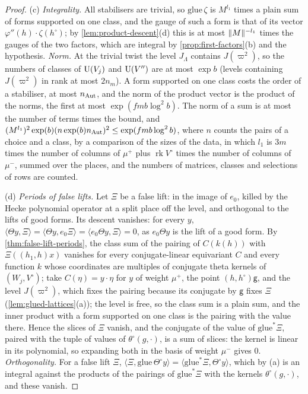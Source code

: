\begin{proof}
(c) \emph{Integrality.} All stabilisers are trivial, so $\mathrm{glue}\,\zeta$ is $M^{l_1}$ times a plain sum of forms supported on one class, and the gauge of such a form is that of its vector $\varphi''(h)\cdot\zeta(h^\circ)$; by \cref{lem:product-descent}(d) this is at most
$\lVert M\rVert^{-l_1}$ times the gauges of the two factors, which are integral by \cref{prop:first-factors}(b) and the hypothesis. \emph{Norm.} At the trivial twist the level $J_\Lambda$ contains $J(\varpi^2)$, so the numbers of classes of $\operatorname{U}(V_j)$ and $\operatorname{U}(V'')$ are at
most $\exp b$ (levels containing $J(\varpi^2)$ in rank at most $2n_m$). A form supported on one class costs the order of a stabiliser, at most $n_{\rm Aut}$, and the norm of the product vector is the product of the norms, the first at most $\exp(fmb\log^2b)$.
The norm of a sum is at most the number of terms times the bound, and $(M^{l_1})^2\exp(b)(n\exp(b)n_{\rm Aut})^2\le\exp(fmb\log^2b)$, where $n$ counts the pairs of a choice and a class, by a comparison of the sizes of the data, in which $l_1$ is $3m$ times the
number of columns of $\mu^+$ plus $\operatorname{rk}V^\circ$ times the number of columns of $\mu^-$, summed over the places, and the numbers of matrices, classes and selections of rows are counted.

(d) \emph{Periods of false lifts.} Let $\Xi$ be a false lift: in the image of $e_0$, killed by the Hecke polynomial operator at a split place off the level, and orthogonal to the lifts of good forms. Its descent vanishes: for every $y$,
$\langle\Theta y,\Xi\rangle=\langle\Theta y,e_0\Xi\rangle=\langle e_0\Theta y,\Xi\rangle=0$, as $e_0\Theta y$ is the lift of a good form. By \cref{thm:false-lift-periods}, the class sum of the pairing of $C(k(h))$ with $\Xi((h_1,h)x)$ vanishes for every conjugate-linear equivariant $C$
and every function $k$ whose coordinates are multiples of conjugate theta kernels of $(W_j,V^\circ)$; take $C(\eta)=y\cdot\eta$ for $y$ of weight $\mu^+$, the point $(h,h^\circ)\mathsf g$, and the level $J(\varpi^2)$, which fixes the pairing because its conjugate by $\mathsf g$ fixes
$\Xi$ (\cref{lem:glued-lattices}(a)); the level is free, so the class sum is a plain sum, and the inner product with a form supported on one class is the pairing with the value there. Hence the slices of $\Xi$ vanish, and the conjugate of the
value of $\mathrm{glue}^*\Xi$, paired with the tuple of values of $\theta^\circ(g,\cdot)$, is a sum of slices: the kernel is linear in its polynomial, so expanding both in the basis of weight $\mu^-$ gives $0$. \emph{Orthogonality.} For a false lift $\Xi$,
$\langle\Xi,\mathrm{glue}\,\Theta^\circ y\rangle=\langle\mathrm{glue}^*\Xi,\Theta^\circ y\rangle$, which by (a) is an integral against the products of the pairings of $\mathrm{glue}^*\Xi$ with the kernels $\theta^\circ(g,\cdot)$, and these vanish.
\end{proof}

